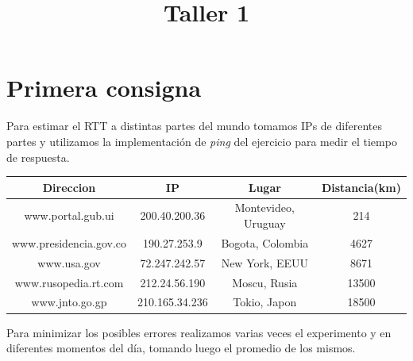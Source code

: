 \documentclass[a4paper]{article}
\title{Taller 1}
\begin{document}


\maketitle

\newpage




\newpage

\section{Primera consigna}

Para estimar el RTT a distintas partes del mundo tomamos IPs de diferentes partes y utilizamos la implementación de \textit{ping} del ejercicio para medir el tiempo de respuesta.  


\begin{table}[H]
\begin{center}
\begin{tabular}{|c|c|c|c|}
\hline
Direccion & IP & Lugar & Distancia(km) \\
\hline
www.portal.gub.ui & 200.40.200.36 & Montevideo, Uruguay & 214 \\
\hline
www.presidencia.gov.co & 190.27.253.9 & Bogota, Colombia & 4627\\
\hline
www.usa.gov & 72.247.242.57 & New York, EEUU & 8671\\
\hline
www.rusopedia.rt.com & 212.24.56.190 & Moscu, Rusia & 13500 \\
\hline
www.jnto.go.gp & 210.165.34.236 & Tokio, Japon  & 18500\\
\hline
\end{tabular}

\end{center}
\end{table}

Para minimizar los posibles errores realizamos varias veces el experimento y en diferentes momentos del día, tomando luego el promedio de los mismos. \\
\end{document}
